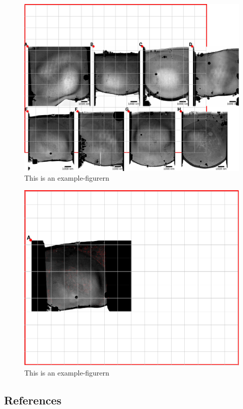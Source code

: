 \documentclass[
]{article}
\begin{document}
\begin{figure}
\hypertarget{fig:approach4}{%
\centering
\includegraphics{figures/example-figure4.pdf}
\caption{This is an example-figurern}\label{fig:approach4}
}
\end{figure}

\begin{figure}
\hypertarget{fig:matching}{%
\centering
\includegraphics{figures/matching.pdf}
\caption{This is an example-figurern}\label{fig:matching}
}
\end{figure}

\hypertarget{references}{%
\subsection{References}\label{references}}
\end{document}
